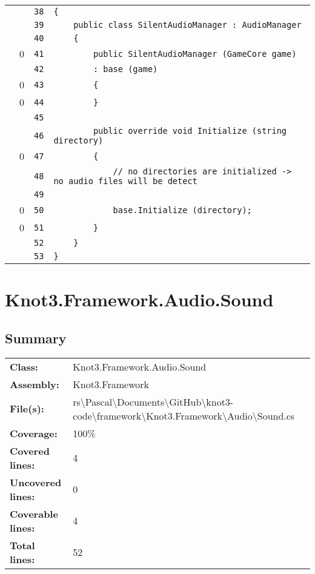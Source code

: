 \documentclass[a4paper,10pt]{article}
\begin{document}
\begin{longtable}[l]{lrrl}
\cellcolor{gray} &  & \verb~38~ & \verb~{~\\
\cellcolor{gray} &  & \verb~39~ & \verb~    public class SilentAudioManager : AudioManager~\\
\cellcolor{gray} &  & \verb~40~ & \verb~    {~\\
\cellcolor{red} & 0 & \verb~41~ & \verb~        public SilentAudioManager (GameCore game)~\\
\cellcolor{gray} &  & \verb~42~ & \verb~        : base (game)~\\
\cellcolor{red} & 0 & \verb~43~ & \verb~        {~\\
\cellcolor{red} & 0 & \verb~44~ & \verb~        }~\\
\cellcolor{gray} &  & \verb~45~ & \verb~~\\
\cellcolor{gray} &  & \verb~46~ & \verb~        public override void Initialize (string directory)~\\
\cellcolor{red} & 0 & \verb~47~ & \verb~        {~\\
\cellcolor{gray} &  & \verb~48~ & \verb~            // no directories are initialized -> no audio files will be detect~\\
\cellcolor{gray} &  & \verb~49~ & \verb~~\\
\cellcolor{red} & 0 & \verb~50~ & \verb~            base.Initialize (directory);~\\
\cellcolor{red} & 0 & \verb~51~ & \verb~        }~\\
\cellcolor{gray} &  & \verb~52~ & \verb~    }~\\
\cellcolor{gray} &  & \verb~53~ & \verb~}~\\
\end{longtable}
\newpage
\section{Knot3.Framework.Audio.Sound}
\subsection{Summary}
\begin{longtable}[l]{ll}
\textbf{Class:} & Knot3.Framework.Audio.Sound\\
\textbf{Assembly:} & Knot3.Framework\\
\textbf{File(s):} & \begin{minipage}[t]{12cm}{rs\textbackslash Pascal\textbackslash Documents\textbackslash GitHub\textbackslash knot3-code\textbackslash framework\textbackslash Knot3.Framework\textbackslash Audio\textbackslash Sound.cs}\end{minipage} \\
\textbf{Coverage:} & 100\%\\
\textbf{Covered lines:} & 4\\
\textbf{Uncovered lines:} & 0\\
\textbf{Coverable lines:} & 4\\
\textbf{Total lines:} & 52\\
\end{longtable}
\end{document}
